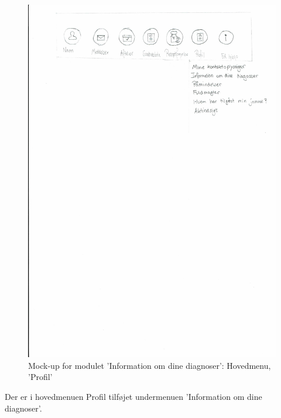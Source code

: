 \begin{figure}[H]
	\centering
	\includegraphics[angle=0, width=\linewidth]{Materials/Information_Hovedmenu.pdf}
	\caption{Mock-up for modulet 'Information om dine diagnoser': Hovedmenu, 'Profil'}
	\label{fig:Mock-Up5}
\end{figure}
Der er i hovedmenuen Profil tilføjet undermenuen 'Information om dine diagnoser'.
